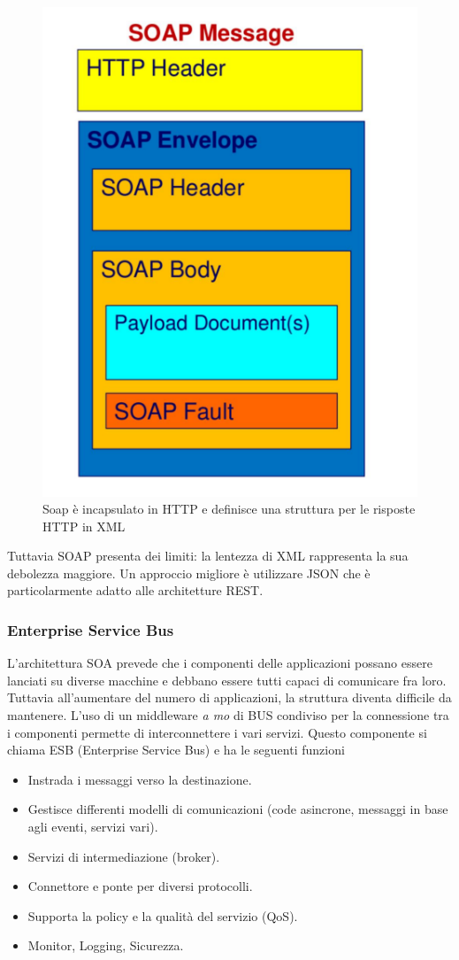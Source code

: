 \documentclass{article}
\begin{document}
		\begin{figure}[ht]
		    \centering
		    \includegraphics[width=0.5\linewidth]{SAC_A2_soapMessage.png}
		    \caption{Soap è incapsulato in HTTP e definisce una struttura per le risposte HTTP in XML}
		\end{figure}
		
		Tuttavia SOAP presenta dei limiti: la lentezza di XML rappresenta la sua debolezza maggiore. Un approccio migliore è utilizzare JSON che è particolarmente adatto alle architetture REST.
		
		\subsubsection{Enterprise Service Bus}
		L'architettura SOA prevede che i componenti delle applicazioni possano essere lanciati su diverse macchine e debbano essere tutti capaci di comunicare fra loro. Tuttavia all'aumentare del numero di applicazioni, la struttura diventa difficile da mantenere.
		\newline
		L'uso di un middleware \textit{a mo} di BUS condiviso per la connessione tra i componenti permette di interconnettere i vari servizi. Questo componente si chiama ESB (Enterprise Service Bus) e ha le seguenti funzioni
		\begin{itemize}
		    \item Instrada i messaggi verso la destinazione.
		    \item Gestisce differenti modelli di comunicazioni (code asincrone, messaggi in base agli eventi, servizi vari).
		    \item Servizi di intermediazione (broker).
		    \item Connettore e ponte per diversi protocolli.
		    \item Supporta la policy e la qualità del servizio (QoS).
		    \item Monitor, Logging, Sicurezza.
		\end{itemize}
		
\end{document}
